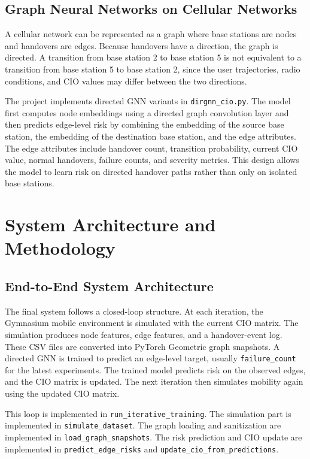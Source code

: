 \documentclass[11pt, a4paper, twoside]{article}
\begin{document}
\subsection{Graph Neural Networks on Cellular Networks}

A cellular network can be represented as a graph where base stations are nodes and handovers are edges. Because handovers have a direction, the graph is directed. A transition from base station 2 to base station 5 is not equivalent to a transition from base station 5 to base station 2, since the user trajectories, radio conditions, and CIO values may differ between the two directions.

The project implements directed GNN variants in \texttt{dirgnn\_cio.py}. The model first computes node embeddings using a directed graph convolution layer and then predicts edge-level risk by combining the embedding of the source base station, the embedding of the destination base station, and the edge attributes. The edge attributes include handover count, transition probability, current CIO value, normal handovers, failure counts, and severity metrics. This design allows the model to learn risk on directed handover paths rather than only on isolated base stations.

\section{System Architecture and Methodology}
\label{sec:methodology}

\subsection{End-to-End System Architecture}

The final system follows a closed-loop structure. At each iteration, the Gymnasium mobile environment is simulated with the current CIO matrix. The simulation produces node features, edge features, and a handover-event log. These CSV files are converted into PyTorch Geometric graph snapshots. A directed GNN is trained to predict an edge-level target, usually \texttt{failure\_count} for the latest experiments. The trained model predicts risk on the observed edges, and the CIO matrix is updated. The next iteration then simulates mobility again using the updated CIO matrix.

This loop is implemented in \texttt{run\_iterative\_training}. The simulation part is implemented in \texttt{simulate\_dataset}. The graph loading and sanitization are implemented in \texttt{load\_graph\_snapshots}. The risk prediction and CIO update are implemented in \texttt{predict\_edge\_risks} and \texttt{update\_cio\_from\_predictions}.
\end{document}
